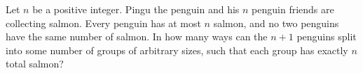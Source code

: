 Let $n$ be a positive integer.
Pingu the penguin and his $n$ penguin friends are collecting salmon.
Every penguin has at most $n$ salmon, and no two penguins have the same number of salmon.
In how many ways can the $n+1$ penguins split into some number of groups of arbitrary sizes,
such that each group has exactly $n$ total salmon?
